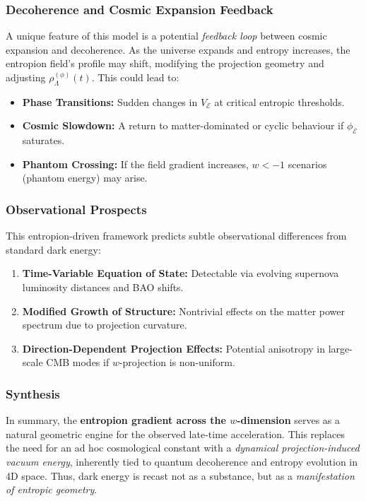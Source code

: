 \documentclass[12pt]{article}
\begin{document}
\subsubsection*{Decoherence and Cosmic Expansion Feedback}

A unique feature of this model is a potential \emph{feedback loop} between cosmic expansion and decoherence. As the universe expands and entropy increases, the entropion field’s profile may shift, modifying the projection geometry and adjusting \(\rho_{\Lambda}^{(\phi)}(t)\). This could lead to:
\begin{itemize}
  \item \textbf{Phase Transitions:} Sudden changes in \(V_{\mathcal{E}}\) at critical entropic thresholds.
  \item \textbf{Cosmic Slowdown:} A return to matter-dominated or cyclic behaviour if \(\phi_{\mathcal{E}}\) saturates.
  \item \textbf{Phantom Crossing:} If the field gradient increases, \(w < -1\) scenarios (phantom energy) may arise.
\end{itemize}

\subsubsection*{Observational Prospects}

This entropion-driven framework predicts subtle observational differences from standard dark energy:
\begin{enumerate}
  \item \textbf{Time-Variable Equation of State:} Detectable via evolving supernova luminosity distances and BAO shifts.
  \item \textbf{Modified Growth of Structure:} Nontrivial effects on the matter power spectrum due to projection curvature.
  \item \textbf{Direction-Dependent Projection Effects:} Potential anisotropy in large-scale CMB modes if \(w\)-projection is non-uniform.
\end{enumerate}

\subsubsection*{Synthesis}

In summary, the \textbf{entropion gradient across the \(w\)-dimension} serves as a natural geometric engine for the observed late-time acceleration. This replaces the need for an ad hoc cosmological constant with a \emph{dynamical projection-induced vacuum energy}, inherently tied to quantum decoherence and entropy evolution in 4D space. Thus, dark energy is recast not as a substance, but as a \emph{manifestation of entropic geometry}.
\end{document}
